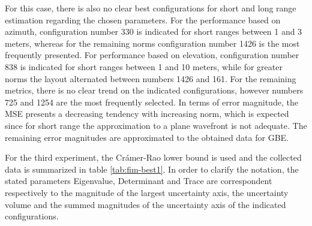 For this case, there is also no clear best configurations for short and long range estimation regarding the chosen parameters. For the performance based on azimuth, configuration number 330 is indicated for short ranges between 1 and 3 meters, whereas for the remaining norms configuration number 1426 is the most frequently presented. For performance based on elevation, configuration number 838 is indicated for short ranges between 1 and 10 meters, while for greater norms the layout alternated between numbers 1426 and 161. For the remaining metrics, there is no clear trend on the indicated configurations, however numbers 725 and 1254 are the most frequently selected. In terms of error magnitude, the MSE presents a decreasing tendency with increasing norm, which is expected since for short range the approximation to a plane wavefront is not adequate. The remaining error magnitudes are approximated to the obtained data for GBE.

For the third experiment, the Crámer-Rao lower bound is used and the collected data is summarized in table \ref{tab:fim-best1}. In order to clarify the notation, the stated parameters Eigenvalue, Determinant and Trace are correspondent respectively to the magnitude of the largest uncertainty axis, the uncertainty volume and the summed magnitudes of the uncertainty axis of the indicated configurations.

